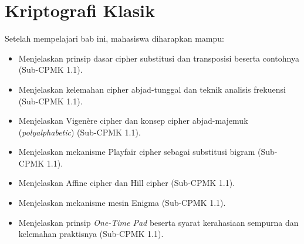 \documentclass[../../main.tex]{subfiles}
\begin{document}
\chapter{Kriptografi Klasik}
\label{chap:kriptografi-klasik}

\begin{learningoutcome}
Setelah mempelajari bab ini, mahasiswa diharapkan mampu:
\begin{itemize}
    \item Menjelaskan prinsip dasar cipher substitusi dan transposisi beserta contohnya (Sub-CPMK 1.1).
    \item Menjelaskan kelemahan cipher abjad-tunggal dan teknik analisis frekuensi (Sub-CPMK 1.1).
    \item Menjelaskan Vigen\`ere cipher dan konsep cipher abjad-majemuk (\textit{polyalphabetic}) (Sub-CPMK 1.1).
    \item Menjelaskan mekanisme Playfair cipher sebagai substitusi bigram (Sub-CPMK 1.1).
    \item Menjelaskan Affine cipher dan Hill cipher (Sub-CPMK 1.1).
    \item Menjelaskan mekanisme mesin Enigma (Sub-CPMK 1.1).
    \item Menjelaskan prinsip \textit{One-Time Pad} beserta syarat kerahasiaan sempurna dan kelemahan praktisnya (Sub-CPMK 1.1).
\end{itemize}
\end{learningoutcome}












\end{document}
